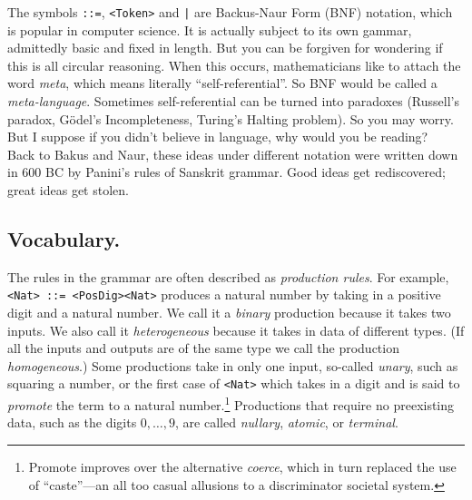 


\begin{remark}
The symbols \lstinline{::=}, \lstinline{<Token>} and \lstinline{|} are 
Backus-Naur Form (BNF) notation, which is popular 
in computer science.  It is actually subject to its own gammar, admittedly 
basic and fixed in length.  But you can be forgiven for wondering if this is 
all circular reasoning.  When this occurs, mathematicians like to attach 
the word \emph{meta}, which means literally ``self-referential''.
So BNF would be called a \emph{meta-language}. Sometimes self-referential 
can be turned into paradoxes (Russell's paradox, G\"odel's Incompleteness,
Turing's Halting problem).  So you may worry.  But I suppose if you 
didn't believe in language, why would you be reading?\\

Back to Bakus and Naur,
these ideas under different notation were written 
down in 600 BC by Panini's rules of Sanskrit grammar.  
Good ideas get rediscovered;
great ideas get stolen.
\end{remark}

\subsection{Vocabulary.}
The rules in the grammar are often described as \emph{production rules}.  For example,
\lstinline{<Nat> ::= <PosDig><Nat>} produces a natural number by taking in a positive digit 
and a natural number.  We call it a \emph{binary} production because it 
takes two inputs.  We also call it \emph{heterogeneous} because it takes in data 
of different types.  (If all the inputs and outputs are of the same type we call the production 
\emph{homogeneous}.)  Some productions take in only one input, so-called \emph{unary},
such as squaring a number, or the first case of \lstinline{<Nat>} which takes in a digit and is said to \emph{promote} the 
term to a natural number.\footnote{Promote improves over the alternative \emph{coerce},
which in turn replaced the use of ``caste''---an all too casual allusions to a discriminator societal 
system.}
Productions that require no preexisting data, such 
as the digits $0,\ldots,9$, are called \emph{nullary}, \emph{atomic}, or \emph{terminal}.
